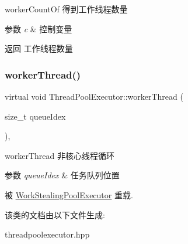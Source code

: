 worker\+Count\+Of 得到工作线程数量 


\begin{DoxyParams}{参数}
{\em c} & 控制变量\\
\hline
\end{DoxyParams}
\begin{DoxyReturn}{返回}
工作线程数量 
\end{DoxyReturn}
\mbox{\label{classThreadPoolExecutor_a844902ce61fb16b11a569b8ee56e80e9}} 
\subsubsection{\texorpdfstring{worker\+Thread()}{workerThread()}}
{\footnotesize\ttfamily virtual void Thread\+Pool\+Executor\+::worker\+Thread (\begin{DoxyParamCaption}\item[{size\+\_\+t}]{queue\+Idex }\end{DoxyParamCaption})\hspace{0.3cm}{\ttfamily [protected]}, {\ttfamily [virtual]}}



worker\+Thread 非核心线程循环 


\begin{DoxyParams}{参数}
{\em queue\+Idex} & 任务队列位置 \\
\hline
\end{DoxyParams}


被 \hyperlink{classWorkStealingPoolExecutor_ad00399d153ba5d77704dae2c1816b566}{Work\+Stealing\+Pool\+Executor} 重载.



该类的文档由以下文件生成\+:\begin{DoxyCompactItemize}
\item 
threadpoolexecutor.\+hpp\end{DoxyCompactItemize}
